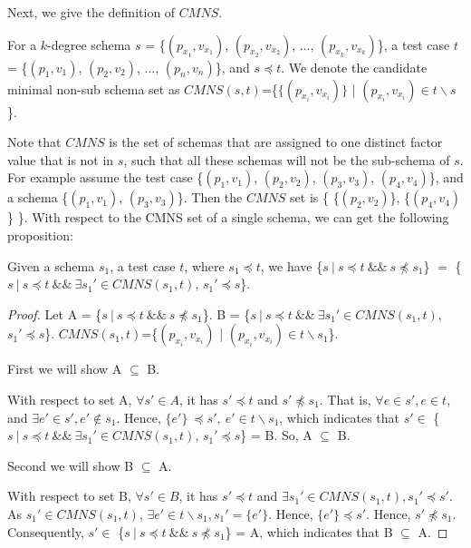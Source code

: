 Next, we give the definition of $CMNS$.

\begin{definition}
For a $k$-degree schema $s$ = \{$(p_{x_{1}}, v_{x_{1}})$, $(p_{x_{2}}, v_{x_{2}})$, ..., $(p_{x_{k}}, v_{x_{k}})$\}, a test case $t$ = \{$(p_{1}, v_{1})$, $(p_{2}, v_{2})$, ..., $(p_{n}, v_{n})$\}, and $s \preceq t$. We denote the candidate minimal non-sub schema set as $CMNS(s,t)$=\{$\{(p_{x_{i}}, v_{x_{i}})\}$ | $(p_{x_{i}}, v_{x_{i}}) \in t \backslash s $\}.
\end{definition}

Note that $CMNS$ is the set of schemas that are assigned to one distinct factor value that is not in $s$, such that all these schemas will not be the sub-schema of $s$. For example assume the test case \{$(p_{1}, v_{1})$, $(p_{2}, v_{2})$, $(p_{3}, v_{3})$, $(p_{4}, v_{4})$\}, and a schema \{$(p_{1}, v_{1})$, $(p_{3}, v_{3})$\}. Then the $CMNS$ set is \{ \{$(p_{2}, v_{2})$\}, \{$(p_{4}, v_{4})$\} \}.  With respect to the CMNS set of a single schema, we can get the following proposition:

\begin{proposition}\label{pro:superofCMNS}
Given a schema $s_{1}$, a test case $t$, where $s_{1} \preceq t$, we have \{$s\ |\ s \preceq t\ \&\&\ s \npreceq s_{1}$\} $=$  \{$ s\ |\ s \preceq t \  \&\& \ \exists s_{1}' \in CMNS(s_{1}, t)$, $s_{1}' \preceq s$\}.
\end{proposition}

\begin{proof}
Let A = \{$s\ |\ s \preceq t\ \&\&\ s \npreceq s_{1}$\}. B = \{$ s\ |\ s \preceq t \ \&\&\  \exists s_{1}' \in CMNS(s_{1}, t)$, $s_{1}' \preceq s$\}. $CMNS(s_{1},t)$=\{$(p_{x_{i}}, v_{x_{i}})$ | $(p_{x_{i}}, v_{x_{i}}) \in t \backslash s_{1} $\}.

First we will show A $\subseteq$ B.

With respect to set A, $\forall s' \in A$, it has $s' \preceq t$ and $s' \npreceq s_{1}$. That is, $\forall e \in s', e \in t$, and  $\exists e' \in s', e' \not\in s_{1}$. Hence, $\{e'\}\ \preceq s',\  e' \in t \backslash s_{1}$, which indicates that $s' \in $ \{$ s\ |\ s \preceq t \ \&\&\  \exists s_{1}' \in CMNS(s_{1}, t)$, $s_{1}' \preceq s$\} = B. So, A $\subseteq$ B.


Second we will show B $\subseteq$ A.

With respect to set B, $\forall s' \in B$, it has $s' \preceq t$  and $\exists s_{1}' \in CMNS(s_{1}, t), s_{1}' \preceq s'$. As $s_{1}' \in CMNS(s_{1}, t)$, $\exists e' \in  t \backslash s_{1}, s_{1}' = \{ e' \}$. Hence, $\{e'\} \preceq s'$. Hence, $s' \npreceq s_{1}$. Consequently, $s' \in $  \{$s\ |\ s \preceq t\ \&\&\ s \npreceq s_{1}$\} = A, which indicates that B $\subseteq$ A.

\end{proof}



